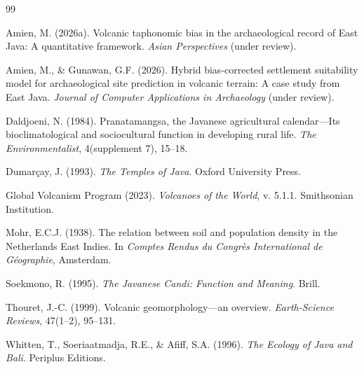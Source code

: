 \documentclass[12pt,a4paper]{article}
\begin{document}
\begin{thebibliography}{99}

Amien, M. (2026a). Volcanic taphonomic bias in the archaeological record of East Java: A quantitative framework. \emph{Asian Perspectives} (under review).

Amien, M., \& Gunawan, G.F. (2026). Hybrid bias-corrected settlement suitability model for archaeological site prediction in volcanic terrain: A case study from East Java. \emph{Journal of Computer Applications in Archaeology} (under review).

Daldjoeni, N. (1984). Pranatamangsa, the Javanese agricultural calendar---Its bioclimatological and sociocultural function in developing rural life. \emph{The Environmentalist}, 4(supplement 7), 15--18.

Dumar\c{c}ay, J. (1993). \emph{The Temples of Java}. Oxford University Press.

Global Volcanism Program (2023). \emph{Volcanoes of the World}, v. 5.1.1. Smithsonian Institution.

Mohr, E.C.J. (1938). The relation between soil and population density in the Netherlands East Indies. In \emph{Comptes Rendus du Congr\`{e}s International de G\'{e}ographie}, Amsterdam.

Soekmono, R. (1995). \emph{The Javanese Candi: Function and Meaning}. Brill.

Thouret, J.-C. (1999). Volcanic geomorphology---an overview. \emph{Earth-Science Reviews}, 47(1--2), 95--131.

Whitten, T., Soeriaatmadja, R.E., \& Afiff, S.A. (1996). \emph{The Ecology of Java and Bali}. Periplus Editions.

\end{thebibliography}
\end{document}
